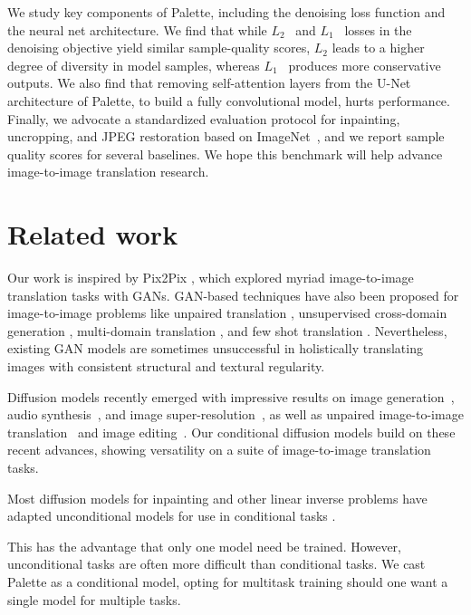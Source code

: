 We study key components of Palette, including the denoising loss function and the neural net architecture. We find that while $L_2$~\citep{ho2020denoising} and $L_1$~\citep{chen-iclr-2021} losses in the denoising objective yield similar sample-quality scores, $L_2$ leads to a higher degree of diversity in model samples, whereas $L_1$~\citep{chen-iclr-2021} produces more conservative outputs. We also find that removing self-attention layers from the U-Net architecture of Palette, to build a fully convolutional model, hurts performance. Finally, we advocate a standardized evaluation protocol for inpainting, uncropping, and JPEG restoration based on ImageNet~\citep{deng2009imagenet}, and we report sample quality scores for several baselines. We hope this benchmark will help advance image-to-image translation research.

\section{Related work}

Our work is inspired by Pix2Pix \citep{isola-cvpr-2017}, which explored myriad image-to-image translation tasks with GANs. GAN-based techniques have also been proposed for image-to-image problems like unpaired translation \citep{zhu2017unpaired}, unsupervised cross-domain generation \citep{taigman2016unsupervised}, multi-domain translation \citep{choi2018stargan}, and few shot translation \citep{liu2019few}. Nevertheless, existing GAN models are sometimes unsuccessful in holistically translating images with consistent structural and textural regularity.

Diffusion models  \citep{sohl2015deep} recently emerged with impressive results on image generation~\citep{ho2020denoising, ho-arxiv-2021, dhariwal2021diffusion}, audio synthesis~\citep{chen-iclr-2021, kong2020diffwave}, and image super-resolution~\citep{saharia2021image,Kadkhodaie2021}, as well as unpaired image-to-image translation~\citep{sasaki2021unit} and image editing~\citep{meng2021sdedit,sinha2021d2c}. Our conditional diffusion models build on these recent advances, showing versatility on a suite of image-to-image translation tasks.

Most diffusion models for inpainting and other linear inverse problems have adapted unconditional models for use in conditional tasks \cite{sohl2015deep,song-iclr-2021,meng2021sdedit}.

This has the advantage that only one model need be trained.  However, unconditional tasks are often more difficult than conditional tasks. We cast Palette as a conditional model, opting for multitask training should one want a single model for multiple tasks.

